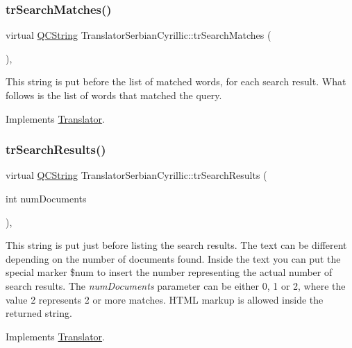 \subsubsection{\texorpdfstring{trSearchMatches()}{trSearchMatches()}}
{\footnotesize\ttfamily virtual \mbox{\hyperlink{class_q_c_string}{Q\+C\+String}} Translator\+Serbian\+Cyrillic\+::tr\+Search\+Matches (\begin{DoxyParamCaption}{ }\end{DoxyParamCaption})\hspace{0.3cm}{\ttfamily [inline]}, {\ttfamily [virtual]}}

This string is put before the list of matched words, for each search result. What follows is the list of words that matched the query. 

Implements \mbox{\hyperlink{class_translator}{Translator}}.

\mbox{\label{class_translator_serbian_cyrillic_afe011ca7d20730f52c8c822b2fa668f6}} 
\subsubsection{\texorpdfstring{trSearchResults()}{trSearchResults()}}
{\footnotesize\ttfamily virtual \mbox{\hyperlink{class_q_c_string}{Q\+C\+String}} Translator\+Serbian\+Cyrillic\+::tr\+Search\+Results (\begin{DoxyParamCaption}\item[{int}]{num\+Documents }\end{DoxyParamCaption})\hspace{0.3cm}{\ttfamily [inline]}, {\ttfamily [virtual]}}

This string is put just before listing the search results. The text can be different depending on the number of documents found. Inside the text you can put the special marker \$num to insert the number representing the actual number of search results. The {\itshape num\+Documents} parameter can be either 0, 1 or 2, where the value 2 represents 2 or more matches. H\+T\+ML markup is allowed inside the returned string. 

Implements \mbox{\hyperlink{class_translator}{Translator}}.

\mbox{\label{class_translator_serbian_cyrillic_a9f5fe6135ec55ca9daf2c4320c580dbe}} 
